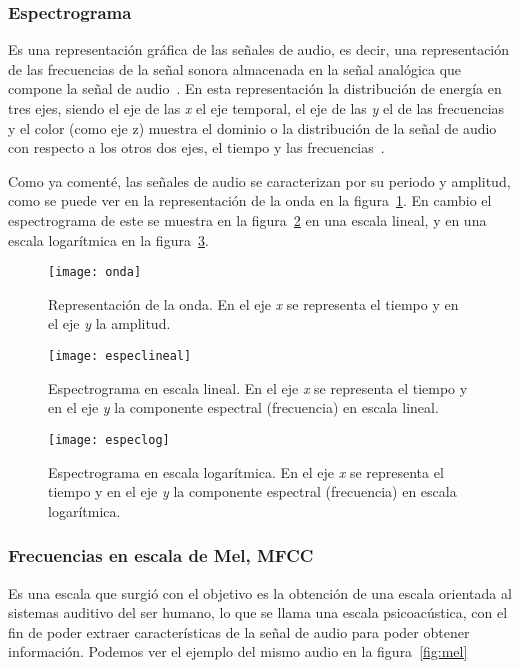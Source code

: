 \subsubsection{Espectrograma}
Es una representación gráfica de las señales de audio, es decir, una representación de las frecuencias de la señal sonora almacenada en la señal analógica que compone la señal de audio~\cite{wiki:espec}. En esta representación la distribución de energía en tres ejes, siendo el eje de las \textit{x} el eje temporal, el eje de las \textit{y} el de las frecuencias y el color (como eje z) muestra el dominio o la distribución de la señal de audio con respecto a los otros dos ejes, el tiempo y las frecuencias~\cite{granesp}.

Como ya comenté, las señales de audio se caracterizan por su periodo y amplitud, como se puede ver en la representación de la onda en la figura~\ref{fig:onda}. En cambio el espectrograma de este se muestra en la figura~\ref{fig:espec} en una escala lineal, y en una escala logarítmica en la figura~\ref{fig:especlog}.
\begin{figure}
	\centering
	\texttt{[image: onda]}
	\caption{Representación de la onda. En el eje \textit{x} se representa el tiempo y en el eje \textit{y} la amplitud.}
	\label{fig:onda}
\end{figure}
\begin{figure}
	\centering
	\texttt{[image: especlineal]}
	\caption{Espectrograma en escala lineal. En el eje \textit{x} se representa el tiempo y en el eje \textit{y} la componente espectral (frecuencia) en escala lineal.}
	\label{fig:espec}
\end{figure}
\begin{figure}
	\centering
	\texttt{[image: especlog]}
	\caption{Espectrograma en escala logarítmica. En el eje \textit{x} se representa el tiempo y en el eje \textit{y} la componente espectral (frecuencia) en escala logarítmica.}
	\label{fig:especlog}
\end{figure}
\subsubsection{Frecuencias en escala de Mel, MFCC} \label{mel}
Es una escala que surgió con el objetivo es la obtención de una escala orientada al sistemas auditivo del ser humano, lo que se llama una escala psicoacústica, con el fin de poder extraer características de la señal de audio para poder obtener información. Podemos ver el ejemplo del mismo audio en la figura~\ref{fig:mel}

